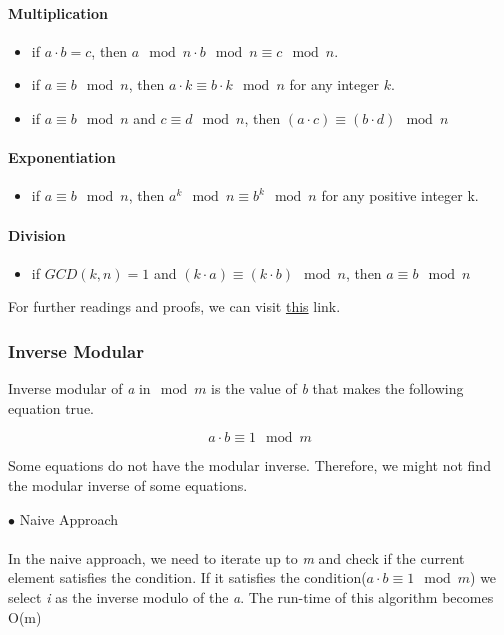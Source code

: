 \documentclass[12pt]{article}
\begin{document}
\paragraph{\textbf{Multiplication}}
\begin{itemize}
  \item if $a \cdot b = c$, then $a \mod{n} \cdot b \mod{n} \equiv c \mod{n}$.
  \item if $a \equiv b \mod{n}$, then $a \cdot k \equiv b \cdot k \mod{n}$ for any integer $k$.
  \item if $a \equiv b \mod{n}$ and $c \equiv d \mod{n}$, then $(a \cdot c) \equiv (b \cdot d) \mod{n}$
\end{itemize}
\paragraph{\textbf{Exponentiation}}
\begin{itemize}
  \item if $a \equiv b \mod{n}$, then $a^k \mod{n} \equiv b^k \mod{n}$ for any positive integer k.
\end{itemize} 

\clearpage

\paragraph{\textbf{Division}}
\begin{itemize}
  \item if $GCD(k, n) = 1$ and $ (k \cdot a) \equiv (k \cdot b) \mod{n} $,  then $a \equiv b \mod{n}$
\end{itemize}

For further readings and proofs, we can visit \href{https://brilliant.org/wiki/modular-arithmetic/ }{this} link.

\subsubsection{Inverse Modular}
Inverse modular of \textit{a} in$\mod{m}$ is the value of \textit{b} that makes the following equation true.

\[ a \cdot b \equiv 1 \mod{m} \]

Some equations do not have the modular inverse. Therefore, we might not find the modular inverse of some equations.

$\bullet$ Naive Approach \\\\
In the naive approach, we need to iterate up to \textit{m} and check if the current element satisfies the condition. If it satisfies the condition($a \cdot b \equiv 1 \mod{m} $) we select \textit{i} as the inverse modulo of the \textit{a}.  The run-time of this algorithm becomes O(m) \\\\
\end{document}
